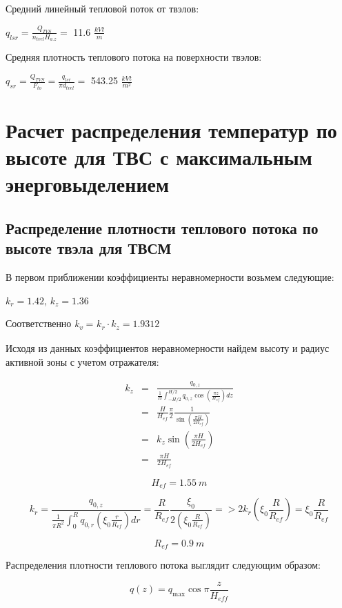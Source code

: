 Средний линейный тепловой поток от твэлов:

\(q_{lsr} = \frac{Q_{TVS}}{n_{tvel}H_{a.z}} =\) 11.6 \(\frac{kVt}{m}\)

Средняя плотность теплового потока на поверхности твэлов:

\(q_{sr} = \frac{Q_{TVS}}{F_{to}} = \frac{q_{lsr}}{\pi d_{tvel}} =\)
543.25 \(\frac{kVt}{m^{2}}\)

\section{Расчет распределения температур по высоте для ТВС с
максимальным энерговыделением}

\subsection{Распределение плотности теплового потока по высоте твэла
для ТВСМ}

В первом приближении коэффициенты неравномерности возьмем следующие:

\(k_{r} = 1.42\), \(k_{z} = 1.36\)

Соответственно \emph{k\textsubscript{v}} =
\(k_{r} \cdot k_{z} = 1.9312\)

Исходя из данных коэффициентов неравномерности найдем высоту и радиус
активной зоны с учетом отражателя:


\begin{eqnarray}
k_{z} &=& \frac{q_{0,z}}{\frac{1}{H}\int_{-H/2}^{H/2}{q_{0,z}\cos{( \frac{\pi z}{H_{ef}} )dz}}} \\
&=& \frac{H}{H_{ef}}\frac{\pi}{2}\frac{1}{\sin( \frac{\pi H}{2H_{ef}})} \\
&=& k_{z}\sin( \frac{\pi H}{2H_{ef}}) \\
&=& \frac{\pi H}{2H_{ef}}
\end{eqnarray}


\[H_{ef} = 1.55\ m\]

\[k_{r} = \frac{q_{0,z}}{\frac{1}{\pi R^{2}}\int_{0}^{R}{q_{0,r}{\left( \xi_{0}\frac{r}{R_{ef}} \right)dr}}} = \frac{R}{R_{ef}}\frac{\xi_{0}}{2\left( \xi_{0}\frac{R}{R_{ef}} \right)} = > 2k_{r}\left( \xi_{0}\frac{R}{R_{ef}} \right) = \xi_{0}\frac{R}{R_{ef}}\]

\[R_{ef} = 0.9\ m\]

Распределения плотности теплового потока выглядит следующим образом:

\[q\left( z \right) = q_{\max}\cos \pi\frac{z}{H_{eff}} \]

